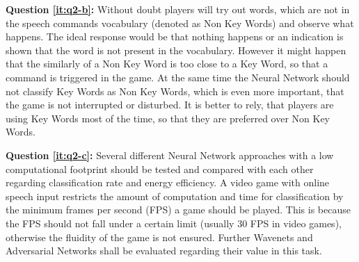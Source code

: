 \textbf{Question \ref{it:q2-b}:} Without doubt players will try out words, which are not in the speech commands vocabulary (denoted as Non Key Words) and observe what happens.
The ideal response would be that nothing happens or an indication is shown that the word is not present in the vocabulary. 
However it might happen that the similarly of a Non Key Word is too close to a Key Word, so that a command is triggered in the game. 
At the same time the Neural Network should not classify Key Words as Non Key Words, which is even more important, that the game is not interrupted or disturbed.
It is better to rely, that players are using Key Words most of the time, so that they are preferred over Non Key Words.

\textbf{Question \ref{it:q2-c}:}
Several different Neural Network approaches with a low computational footprint should be tested and compared with each other regarding classification rate and energy efficiency. 
A video game with online speech input restricts the amount of computation and time for classification by the minimum frames per second (FPS) a game should be played.
This is because the FPS should not fall under a certain limit (usually 30 FPS in video games), otherwise the fluidity of the game is not ensured.
Further Wavenets and Adversarial Networks shall be evaluated regarding their value in this task.